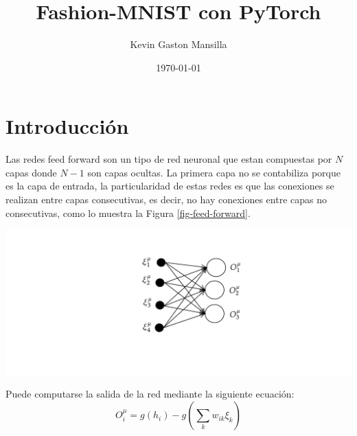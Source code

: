 \documentclass[aps,prl,reprint,groupedaddress]{revtex4-2}
\newenvironment{Figura}
  {\par\medskip\noindent\minipage{\linewidth}}
  {\endminipage\par\medskip}
\begin{document}
\title{
Fashion-MNIST con PyTorch
}

\author{Kevin Gaston Mansilla}

\affiliation{}

\date{\today}

\begin{abstract}
\end{abstract}


\maketitle

\section{Introducción}
Las redes feed forward son un tipo de red neuronal que estan compuestas por 
$N$ capas donde $N-1$ son capas ocultas. La primera capa no se contabiliza 
porque es la capa de entrada, la particularidad de estas redes es que las 
conexiones se realizan entre capas consecutivas, es decir, no hay conexiones
entre capas no consecutivas, como lo muestra la Figura \ref{fig-feed-forward}.
\begin{Figura}
  \centering
  \includegraphics[width=1\textwidth]{figs/red-feed-forward.pdf}
  \label{fig-feed-forward}
\end{Figura}

Puede computarse la salida de la red mediante la siguiente ecuación:
\begin{equation}
  O^{\mu}_{i} = g(h_{i}) - g \left( \sum_{k} w_{ik} \xi_{k} \right)
  \label{eq-feed-forward}
\end{equation}
\end{document}
